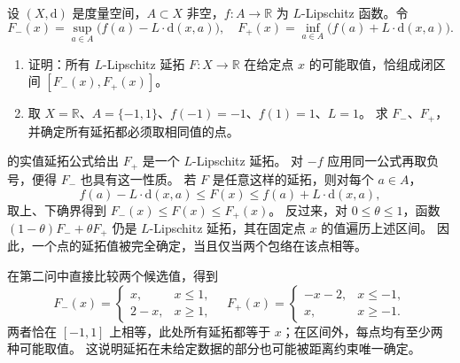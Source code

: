 \begin{exercise}\label{b1:ex:16-extremal-extensions}
设 \((X,\mathrm{d})\) 是度量空间，\(A\subset X\) 非空，\(f:A\to\mathbb R\) 为 \(L\)-Lipschitz 函数。令
\[
 F_-(x)=\sup_{a\in A}\bigl(f(a)-L\cdot \mathrm{d}(x,a)\bigr),
 \quad
 F_+(x)=\inf_{a\in A}\bigl(f(a)+L\cdot \mathrm{d}(x,a)\bigr).
\]
\begin{enumerate}
\item\label{b1:item:16-extension-extrema}
证明：所有 \(L\)-Lipschitz 延拓 \(F:X\to\mathbb R\) 在给定点 \(x\) 的可能取值，恰组成闭区间 \([F_-(x),F_+(x)]\)。
\item\label{b1:item:16-extension-forced-region}
取 \(X=\mathbb R\)、\(A=\{-1,1\}\)、\(f(-1)=-1\)、\(f(1)=1\)、\(L=1\)。
求 \(F_-\)、\(F_+\)，并确定所有延拓都必须取相同值的点。
\end{enumerate}
\end{exercise}
\begin{solution}
的实值延拓公式给出 \(F_+\) 是一个 \(L\)-Lipschitz 延拓。
对 \(-f\) 应用同一公式再取负号，便得 \(F_-\) 也具有这一性质。
若 \(F\) 是任意这样的延拓，则对每个 \(a\in A\)，
\[
 f(a)-L\cdot \mathrm{d}(x,a)\le F(x)\le f(a)+L\cdot \mathrm{d}(x,a),
\]
取上、下确界得到 \(F_-(x)\le F(x)\le F_+(x)\)。
反过来，对 \(0\le\theta\le1\)，函数 \((1-\theta)F_-+\theta F_+\) 仍是 \(L\)-Lipschitz 延拓，其在固定点 \(x\) 的值遍历上述区间。
因此，一个点的延拓值被完全确定，当且仅当两个包络在该点相等。

在第二问中直接比较两个候选值，得到
\[
 F_-(x)=
 \begin{cases}
 x,&x\le1,\\
 2-x,&x\ge1,
 \end{cases}
 \quad
 F_+(x)=
 \begin{cases}
 -x-2,&x\le-1,\\
 x,&x\ge-1.
 \end{cases}
\]
两者恰在 \([-1,1]\) 上相等，此处所有延拓都等于 \(x\)；在区间外，每点均有至少两种可能取值。
这说明延拓在未给定数据的部分也可能被距离约束唯一确定。
\end{solution}

